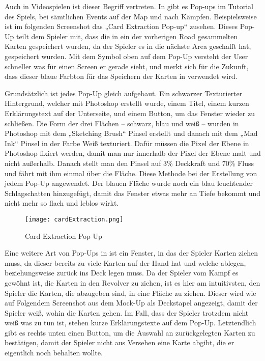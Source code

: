 Auch in Videospielen ist dieser Begriff vertreten. In \FF gibt es Pop-ups im Tutorial des Spiels, bei sämtlichen Events auf der Map und nach Kämpfen. Beispielsweise ist im folgenden Screenshot das „Card Extraction Pop-up“ zusehen. Dieses Pop-Up teilt dem Spieler mit, dass die in ein der vorherigen Road gesammelten Karten gespeichert wurden, da der Spieler es in die nächste Area geschafft hat, gespeichert wurden. Mit dem Symbol oben auf dem Pop-Up versteht der User schneller was für einen Screen er gerade sieht, und merkt sich für die Zukunft, dass dieser blaue Farbton für das Speichern der Karten in \FF verwendet wird.

Grundsätzlich ist jedes Pop-Up gleich aufgebaut. Ein schwarzer Texturierter Hintergrund, welcher mit Photoshop erstellt wurde, einem Titel, einem kurzen Erklärungstext auf der Unterseite, und einem Button, um das Fenster wieder zu schließen. Die Form der drei Flächen – schwarz, blau und weiß – wurden in Photoshop mit dem „Sketching Brush“ Pinsel erstellt und danach mit dem „Mad Ink“ Pinsel in der Farbe Weiß texturiert. Dafür müssen die Pixel der Ebene in Photoshop fixiert werden, damit man nur innerhalb der Pixel der Ebene malt und nicht außerhalb. Danach stellt man den Pinsel auf 3\% Deckkraft und 70\% Fluss und fährt mit ihm einmal über die Fläche. Diese Methode bei der Erstellung von jedem Pop-Up angewendet. Der blauen Fläche wurde noch ein blau leuchtender Schlagschatten hinzugefügt, damit das Fenster etwas mehr an Tiefe bekommt und nicht mehr so flach und leblos wirkt.

\begin{figure}[H]
    \centering
    \texttt{[image: cardExtraction.png]}
    \caption{Card Extraction Pop Up}
\end{figure}

Eine weitere Art von Pop-Ups in \FF ist ein Fenster, in das der Spieler Karten ziehen muss, da dieser bereits zu viele Karten auf der Hand hat und welche ablegen, beziehungsweise zurück ins Deck legen muss. Da der Spieler vom Kampf es gewöhnt ist, die Karten in den Revolver zu ziehen, ist es hier am intuitivsten, den Spieler die Karten, die abzugeben sind, in eine Fläche zu ziehen. Dieser wird wie auf Folgendem Screenshot aus dem Mock-Up als Deckstapel angezeigt, damit der Spieler weiß, wohin die Karten gehen. Im Fall, dass der Spieler trotzdem nicht weiß was zu tun ist, stehen kurze Erklärungstexte auf dem Pop-Up. Letztendlich gibt es rechts unten einen Button, um die Auswahl an zurückgelegten Karten zu bestätigen, damit der Spieler nicht aus Versehen eine Karte abgibt, die er eigentlich noch behalten wollte.


